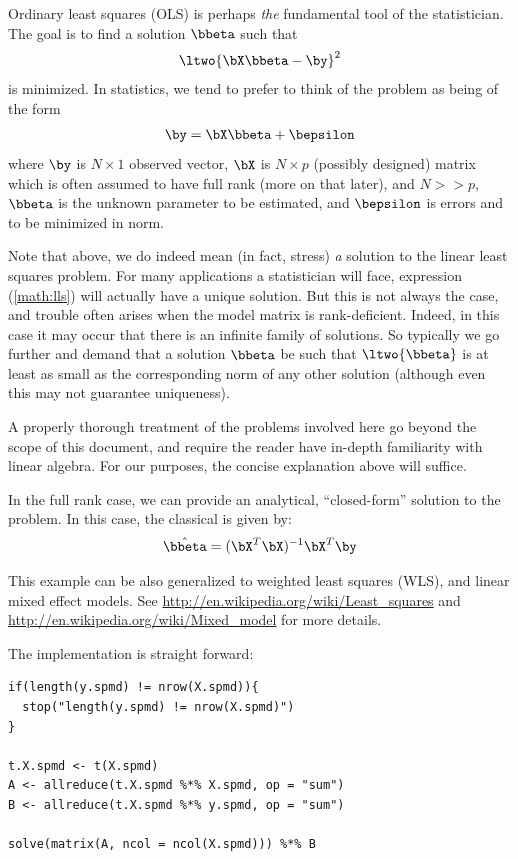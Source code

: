 Ordinary least squares (OLS)
is perhaps \emph{the} fundamental tool of the statistician. The goal is to
find a solution $\bbeta$ such that
\begin{align}
\ltwo{ \bX\bbeta - \by }^2 \label{math:lls}
\end{align}
is minimized. In statistics, we tend to prefer to think of the problem as
being of the form
\begin{align}
\by = \bX\bbeta + \bepsilon \label{math:statslls}
\end{align}
where $\by$ is $N\times 1$ observed vector,
$\bX$ is $N\times p$ (possibly designed) matrix which is often assumed to
have full rank (more on that later), and $N >> p$,
$\bbeta$ is the unknown parameter to be estimated,
and $\bepsilon$ is errors and to be minimized in norm.

Note that above, we do indeed mean (in fact, stress) \emph{a} solution
to the linear least squares problem. For many applications a statistician
will face, expression (\ref{math:lls}) will actually have a unique
solution. But this is not always the case, and trouble often arises when
the model matrix is rank-deficient. Indeed, in this case it may occur
that there is an infinite family of solutions. So typically we go further
and demand that a solution $\bbeta$ be such that $\ltwo{\bbeta}$ is at
least as small as the corresponding norm of any other solution (although
even this may not guarantee uniqueness).

A properly thorough treatment of the problems involved here go beyond the
scope of this document, and require the reader have in-depth familiarity
with linear algebra. For our purposes, the concise explanation above will
suffice.  



In the full rank case, we can provide an analytical, ``closed-form''
solution to the problem.  In this case, the classical
is given by:
\begin{align}
 \hat{\bbeta} = (\bX^T\bX)^{-1}\bX^T\by \label{math:ols}
\end{align}
 
This example can be also generalized to weighted least squares (WLS),
and linear mixed effect models.
See \url{http://en.wikipedia.org/wiki/Least_squares} and
\url{http://en.wikipedia.org/wiki/Mixed_model} for more details.

The implementation is straight forward:
\begin{lstlisting}[language=rr,title=R Code]
if(length(y.spmd) != nrow(X.spmd)){
  stop("length(y.spmd) != nrow(X.spmd)")
}

t.X.spmd <- t(X.spmd)
A <- allreduce(t.X.spmd %*% X.spmd, op = "sum")
B <- allreduce(t.X.spmd %*% y.spmd, op = "sum")

solve(matrix(A, ncol = ncol(X.spmd))) %*% B
\end{lstlisting}

